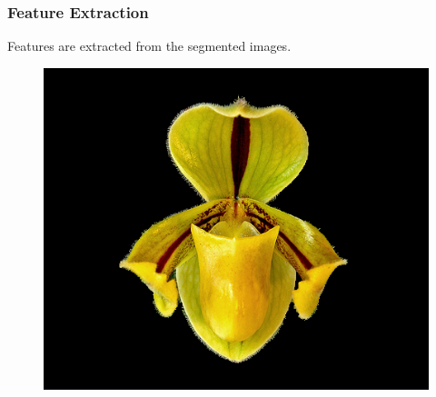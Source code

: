 \documentclass[]{beamer}
\begin{document}
    \begin{frame}
        \frametitle{Feature Extraction}

        Features are extracted from the segmented images.

        \begin{figure}[!htb]
              \includegraphics[width=\linewidth]{grabcut_output}
            \endminipage\hfill
        \end{figure}
    \end{frame}
\end{document}
